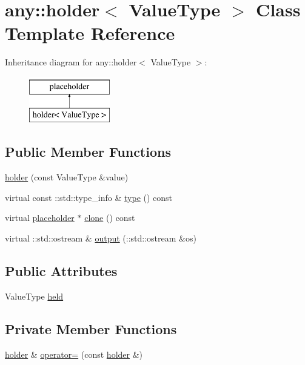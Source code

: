 \hypertarget{classyuh_1_1any_1_1holder}{\section{any\-:\-:holder$<$ \-Value\-Type $>$ \-Class \-Template \-Reference}
\label{dc/d8f/classyuh_1_1any_1_1holder}
}
\-Inheritance diagram for any\-:\-:holder$<$ \-Value\-Type $>$\-:\begin{figure}[H]
\begin{center}
\leavevmode
\includegraphics[height=2.000000cm]{dc/d8f/classyuh_1_1any_1_1holder}
\end{center}
\end{figure}
\subsection*{\-Public \-Member \-Functions}
\begin{DoxyCompactItemize}
\item 
\hyperlink{classyuh_1_1any_1_1holder_a4240001abf3fba918bc650ddb5e38239}{holder} (const \-Value\-Type \&value)
\item 
virtual const \-::std\-::type\-\_\-info \& \hyperlink{classyuh_1_1any_1_1holder_a46bcccb2325469ae16d103be16abd4b9}{type} () const 
\item 
virtual \hyperlink{classyuh_1_1any_1_1placeholder}{placeholder} $\ast$ \hyperlink{classyuh_1_1any_1_1holder_a43bd5da15700b27a731a7ec02428eeef}{clone} () const 
\item 
virtual \-::std\-::ostream \& \hyperlink{classyuh_1_1any_1_1holder_ae2b1d2c000a3620614d1dc4d367d073d}{output} (\-::std\-::ostream \&os)
\end{DoxyCompactItemize}
\subsection*{\-Public \-Attributes}
\begin{DoxyCompactItemize}
\item 
\-Value\-Type \hyperlink{classyuh_1_1any_1_1holder_a54a9c5b6e9b85a2a37a16b07905414db}{held}
\end{DoxyCompactItemize}
\subsection*{\-Private \-Member \-Functions}
\begin{DoxyCompactItemize}
\item 
\hyperlink{classyuh_1_1any_1_1holder}{holder} \& \hyperlink{classyuh_1_1any_1_1holder_abde5b12649b80ab7d49fc350d1436850}{operator=} (const \hyperlink{classyuh_1_1any_1_1holder}{holder} \&)
\end{DoxyCompactItemize}



